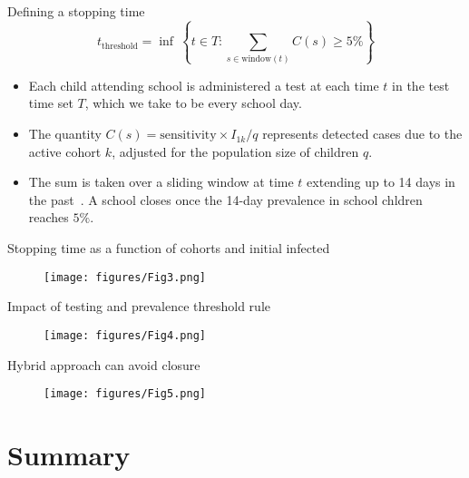 \documentclass[8pt]{beamer}
\begin{document}
\begin{frame}{Defining a stopping time}    
\[
    t_{\text{threshold}} = \inf~
    \left\{
        t \in T : \sum_{s \in \text{window}(t)} C(s) \ge 5 \%
    \right\}
\]

\begin{itemize}
    \item Each child attending school is administered a test at each time $t$ in the test time set $T$, which we take to be every school day.
    \item The quantity $C(s) = \text{sensitivity} \times I_{1k} / q$ represents detected cases due to the active cohort $k$, adjusted for the population size of children $q$.
    \item The sum is taken over a sliding window at time $t$ extending up to 14 days in the past~\footnotemark[1]. A school closes once the 14-day prevalence in school chldren reaches $5\%$.
\end{itemize}

\end{frame}

\begin{frame}{Stopping time as a function of cohorts and initial infected}
\begin{figure}
    \centering
    \texttt{[image: figures/Fig3.png]}
\end{figure}
\end{frame}

\begin{frame}{Impact of testing and prevalence threshold rule}
\begin{figure}
    \centering
    \texttt{[image: figures/Fig4.png]}
\end{figure}
\end{frame}

\begin{frame}{Hybrid approach can avoid closure}
\begin{figure}
    \centering
    \texttt{[image: figures/Fig5.png]}
\end{figure}
\end{frame}

\section{Summary}
\end{document}

